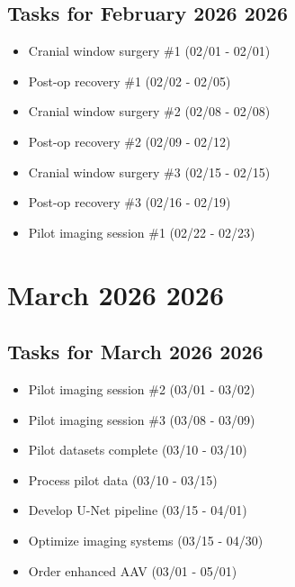 \documentclass[landscape,a4paper]{article}
\begin{document}
\begin{center}
\begin{tikzpicture}[scale=0.9]
\end{tikzpicture}
\end{center}

\vspace{1cm}

\subsection*{Tasks for February 2026 2026}
\begin{itemize}
\item Cranial window surgery \#1 (02/01 - 02/01)
\item Post-op recovery \#1 (02/02 - 02/05)
\item Cranial window surgery \#2 (02/08 - 02/08)
\item Post-op recovery \#2 (02/09 - 02/12)
\item Cranial window surgery \#3 (02/15 - 02/15)
\item Post-op recovery \#3 (02/16 - 02/19)
\item Pilot imaging session \#1 (02/22 - 02/23)
\end{itemize}
\newpage

\section*{March 2026 2026}

\begin{center}
\begin{tikzpicture}[scale=0.9]
\end{tikzpicture}
\end{center}

\vspace{1cm}

\subsection*{Tasks for March 2026 2026}
\begin{itemize}
\item Pilot imaging session \#2 (03/01 - 03/02)
\item Pilot imaging session \#3 (03/08 - 03/09)
\item Pilot datasets complete (03/10 - 03/10)
\item Process pilot data (03/10 - 03/15)
\item Develop U-Net pipeline (03/15 - 04/01)
\item Optimize imaging systems (03/15 - 04/30)
\item Order enhanced AAV (03/01 - 05/01)
\end{itemize}
\newpage
\end{document}
